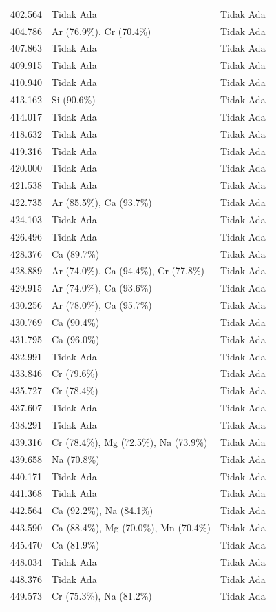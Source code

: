 \begin{onehalfspace}
\begin{longtable}{p{} p{} p{}}
    402.564 & Tidak Ada & Tidak Ada \\
    404.786 & Ar (76.9\%), Cr (70.4\%) & Tidak Ada \\
    407.863 & Tidak Ada & Tidak Ada \\
    409.915 & Tidak Ada & Tidak Ada \\
    410.940 & Tidak Ada & Tidak Ada \\
    413.162 & Si (90.6\%) & Tidak Ada \\
    414.017 & Tidak Ada & Tidak Ada \\
    418.632 & Tidak Ada & Tidak Ada \\
    419.316 & Tidak Ada & Tidak Ada \\
    420.000 & Tidak Ada & Tidak Ada \\
    421.538 & Tidak Ada & Tidak Ada \\
    422.735 & Ar (85.5\%), Ca (93.7\%) & Tidak Ada \\
    424.103 & Tidak Ada & Tidak Ada \\
    426.496 & Tidak Ada & Tidak Ada \\
    428.376 & Ca (89.7\%) & Tidak Ada \\
    428.889 & Ar (74.0\%), Ca (94.4\%), Cr (77.8\%) & Tidak Ada \\
    429.915 & Ar (74.0\%), Ca (93.6\%) & Tidak Ada \\
    430.256 & Ar (78.0\%), Ca (95.7\%) & Tidak Ada \\
    430.769 & Ca (90.4\%) & Tidak Ada \\
    431.795 & Ca (96.0\%) & Tidak Ada \\
    432.991 & Tidak Ada & Tidak Ada \\
    433.846 & Cr (79.6\%) & Tidak Ada \\
    435.727 & Cr (78.4\%) & Tidak Ada \\
    437.607 & Tidak Ada & Tidak Ada \\
    438.291 & Tidak Ada & Tidak Ada \\
    439.316 & Cr (78.4\%), Mg (72.5\%), Na (73.9\%) & Tidak Ada \\
    439.658 & Na (70.8\%) & Tidak Ada \\
    440.171 & Tidak Ada & Tidak Ada \\
    441.368 & Tidak Ada & Tidak Ada \\
    442.564 & Ca (92.2\%), Na (84.1\%) & Tidak Ada \\
    443.590 & Ca (88.4\%), Mg (70.0\%), Mn (70.4\%) & Tidak Ada \\
    445.470 & Ca (81.9\%) & Tidak Ada \\
    448.034 & Tidak Ada & Tidak Ada \\
    448.376 & Tidak Ada & Tidak Ada \\
    449.573 & Cr (75.3\%), Na (81.2\%) & Tidak Ada \\


\end{longtable}
\end{onehalfspace}
